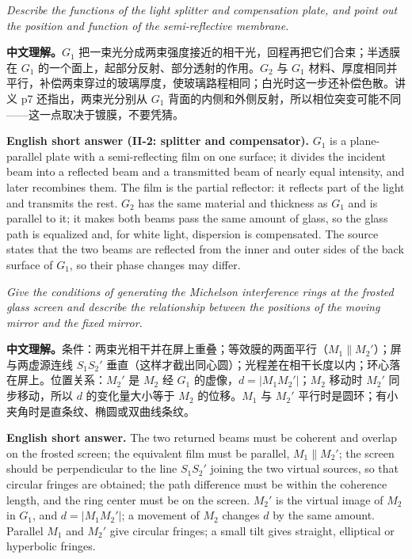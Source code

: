 \documentclass[11pt]{ctexart}
\begin{document}

\textit{Describe the functions of the light splitter and compensation plate, and point out the position and function of the semi-reflective membrane.}

\textbf{中文理解。}\(G_1\) 把一束光分成两束强度接近的相干光，回程再把它们合束；半透膜在 \(G_1\) 的一个面上，起部分反射、部分透射的作用。\(G_2\) 与 \(G_1\) 材料、厚度相同并平行，补偿两束穿过的玻璃厚度，使玻璃路程相同；白光时这一步还补偿色散。讲义 p7 还指出，两束光分别从 \(G_1\) 背面的内侧和外侧反射，所以相位突变可能不同——这一点取决于镀膜，不要凭猜。

\textbf{English short answer (II-2: splitter and compensator).} \(G_1\) is a plane-parallel plate with a semi-reflecting film on one surface; it divides the incident beam into a reflected beam and a transmitted beam of nearly equal intensity, and later recombines them. The film is the partial reflector: it reflects part of the light and transmits the rest. \(G_2\) has the same material and thickness as \(G_1\) and is parallel to it; it makes both beams pass the same amount of glass, so the glass path is equalized and, for white light, dispersion is compensated. The source states that the two beams are reflected from the inner and outer sides of the back surface of \(G_1\), so their phase changes may differ.


\textit{Give the conditions of generating the Michelson interference rings at the frosted glass screen and describe the relationship between the positions of the moving mirror and the fixed mirror.}

\textbf{中文理解。}条件：两束光相干并在屏上重叠；等效膜的两面平行（\(M_1\parallel M_2'\)）；屏与两虚源连线 \(S_1S_2'\) 垂直（这样才截出同心圆）；光程差在相干长度以内；环心落在屏上。位置关系：\(M_2'\) 是 \(M_2\) 经 \(G_1\) 的虚像，\(d=|M_1M_2'|\)；\(M_2\) 移动时 \(M_2'\) 同步移动，所以 \(d\) 的变化量大小等于 \(M_2\) 的位移。\(M_1\) 与 \(M_2'\) 平行时是圆环；有小夹角时是直条纹、椭圆或双曲线条纹。

\textbf{English short answer.} The two returned beams must be coherent and overlap on the frosted screen; the equivalent film must be parallel, \(M_1\parallel M_2'\); the screen should be perpendicular to the line \(S_1S_2'\) joining the two virtual sources, so that circular fringes are obtained; the path difference must be within the coherence length, and the ring center must be on the screen. \(M_2'\) is the virtual image of \(M_2\) in \(G_1\), and \(d=|M_1M_2'|\); a movement of \(M_2\) changes \(d\) by the same amount. Parallel \(M_1\) and \(M_2'\) give circular fringes; a small tilt gives straight, elliptical or hyperbolic fringes.
\end{document}
